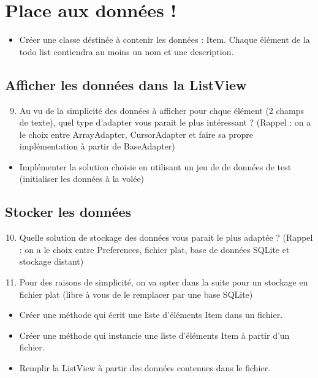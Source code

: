 \documentclass{article}
\begin{document}
 \section{Place aux données !}
 \begin{itemize}
  \item Créer une classe déstinée à contenir les données : Item. Chaque élément de la todo list contiendra au moins un nom et une description.
 \end{itemize}
 \subsection{Afficher les données dans la ListView}
   \begin{enumerate}
 \setcounter{enumi}{8}
\item Au vu de la simplicité des données à afficher pour chque élément (2 champs de texte), quel type d'adapter vous parait le plus intéressant ? 
(Rappel : on a le choix entre ArrayAdapter, CursorAdapter et faire sa propre implémentation à partir de BaseAdapter)
\end{enumerate}
 \begin{itemize}
  \item Implémenter la solution choisie en utilisant un jeu de de données de test (initialiser les données à la volée)
 \end{itemize}
  \subsection{Stocker les données}
  \begin{enumerate}
 \setcounter{enumi}{9}
\item Quelle solution de stockage des données vous parait le plus adaptée ? (Rappel : on a le choix entre Preferences, fichier plat, base de données SQLite et stockage distant)
\item Pour des raisons de simplicité, on va opter dans la suite pour un stockage en fichier plat (libre à vous de le remplacer par une base SQLite)
\end{enumerate}
 \begin{itemize}
  \item Créer une méthode qui écrit une liste d'éléments Item dans un fichier.
  \item Créer une méthode qui instancie une liste d'éléments Item à partir d'un fichier.
  \item Remplir la ListView à partir des données contenues dans le fichier.
 \end{itemize}
\end{document}
